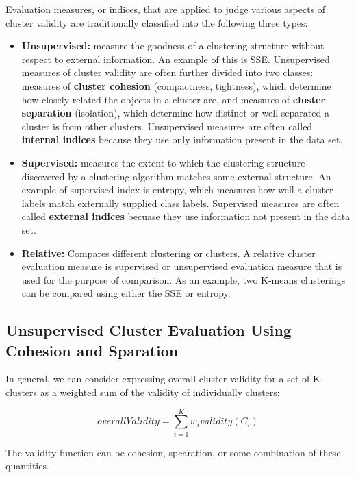 		\clearpage
		Evaluation measures, or indices, that are applied to judge various aspects of cluster validity
		are traditionally classified into the following three types:

			\begin{itemize}
				\item {\bf Unsupervised:} measure the goodness of a clustering structure without
				respect to external information. An example of this is SSE. 
				Unsupervised measures of cluster validity are often further divided into
				two classes: measures of {\bf cluster cohesion} (compactness, tightness), which
				determine how closely related the objects in a cluster are, and measures
				of {\bf cluster separation} (isolation), which determine how distinct or well
				separated a cluster is from other clusters. Unsupervised measures are often
				called {\bf internal indices} because they use only information present in the
				data set.
				\item {\bf Supervised:} measures the extent to which the clustering structure
				discovered by a clustering algorithm matches some external structure. 
				An example of supervised index is entropy, which measures how well a cluster
				labels match externally supplied class labels. Supervised measures are 
				often called {\bf external indices} becuase they use information not present
				in the data set. 
				\item {\bf Relative:} Compares different clustering or clusters. A relative 
				cluster evaluation measure is supervised or unsupervised evaluation measure 
				that is used for the purpose of comparison. As an example, two K-means clusterings
				can be compared using either the SSE or entropy. 
			\end{itemize}

		\subsection{Unsupervised Cluster Evaluation Using Cohesion and Sparation}
			In general, we can consider expressing overall cluster validity for a set of 
			K clusters as a weighted sum of the validity of individually clusters:

				\begin{equation}
					overall Validity = \sum_{i=1}^{K} w_{i} validity(C_{i})
				\end{equation}

			The validity function can be cohesion, spearation, or some combination of 
			these quantities.

